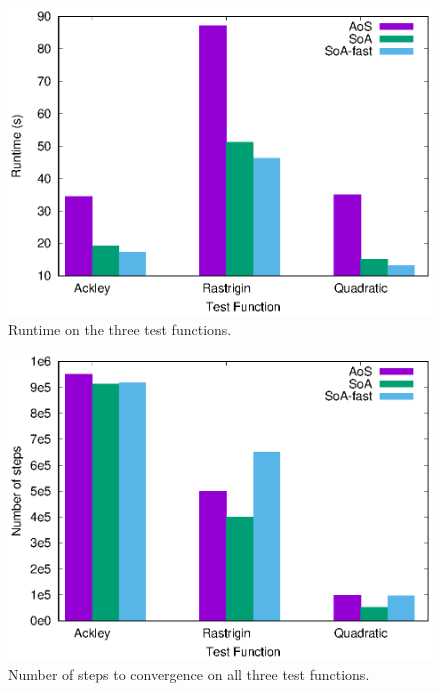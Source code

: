 % 

\begin{figure}
  \includegraphics[width=\columnwidth]{../img/output/all3time}
  \caption{Runtime on the three test functions.}
  \label{fig:all3time}
\end{figure}

\begin{figure}
  \includegraphics[width=\columnwidth]{../img/output/all3steps}
  \caption{Number of steps to convergence on all three test functions.}
  \label{fig:all3steps}
\end{figure}

